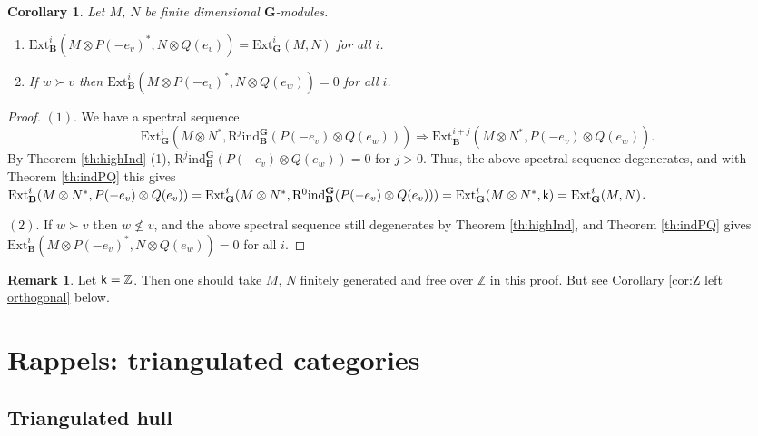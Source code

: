 \documentclass[sn-mathphys-num]{sn-jnl}%
\newcommand{\RR}{\mathrm R}
\newcommand{\ind}{{\mathrm{ind}}}
\newcommand{\Ext}{{\mathrm{Ext}}}
\newcommand{\sk}{{\sf k}}
\newcommand{\Z}{{\mathbb Z}}
\newcommand{\bg}{\mathbf G}
\newcommand{\fb}{\mathbf B}
\newtheorem{corollary}[theorem]{Corollary}
\theoremstyle{definition}
\newtheorem{remark}[theorem]{Remark}
\begin{document}
\begin{corollary}\label{cor:left orthogonal}
Let $M$, $N$ be finite dimensional $ \bg$-modules.
\begin{enumerate}
\item $\Ext^i_{\fb}(M\otimes P(-e_v)^*,N\otimes Q(e_v))=\Ext^i_ \bg (M,N) $ for all $i$.
\item If $w\succ v$ then $\Ext^i_{\fb}(M\otimes P(-e_v)^*,N\otimes Q(e_w))=0$ for all $i$.
\end{enumerate}
\end{corollary}
\begin{proof}
$(1).$ We have a spectral sequence  \cite[I Proposition 4.5]{Jan}
$$\Ext^i_ \bg (M\otimes N^*,\RR^j\ind_{\fb}^ \bg (P(-e_v)\otimes Q(e_w)))\Rightarrow \Ext^{i+j}_{\fb}(M\otimes N^*,P(-e_v)\otimes Q(e_w)).$$
By Theorem \ref{th:highInd} (1), $\RR^j\ind_{\fb}^ \bg (P(-e_v)\otimes Q(e_w))=0$ for $j>0$. Thus, the above spectral sequence degenerates, and with Theorem \ref{th:indPQ}  this gives
$\Ext^{i}_{\fb}(M\otimes N^*,P(-e_v)\otimes Q(e_v))=\Ext^i_ \bg (M\otimes N^*,\RR^0\ind_{\fb}^ \bg (P(-e_v)\otimes Q(e_v)))=
\Ext^i_ \bg (M\otimes N^*,\sk)=\Ext^i_ \bg (M,N)$.



$(2).$ If $w\succ v$ then $w\not\leq v$, and the above spectral sequence still degenerates by Theorem \ref{th:highInd}, and 
Theorem \ref{th:indPQ} gives $\Ext^i_{\fb}(M\otimes P(-e_v)^*,N\otimes Q(e_w))=0$ for all $i$.
\end{proof}

\begin{remark}\label{rem:fr left orthogonal}
Let $\sk=\Z$. Then one should take $M$, $N$ finitely generated and free over $\Z$ in this proof. But see  Corollary \ref{cor:Z left orthogonal} below.
\end{remark}

\section{Rappels: triangulated categories}\label{sec:rappel_triangulated}

\subsection{Triangulated hull }
\end{document}
